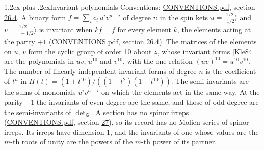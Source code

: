 \documentclass[10pt,a4paper]{article}
\makeatletter
\renewcommand\section{\@startsection{section}{1}{\z@}{-3ex plus -1ex minus -.2ex}%
  {1.2ex plus .2ex}{\normalfont\large\sffamily\bfseries\color{parttitle}}}
\numberwithin{equation}{section}
\newcommand{\grp}[1]{\mathsf{#1}}
\newcommand{\jm}[2]{\bigl\lvert{}^{#1}_{\,#2}\bigr\rangle}
\makeatother
\begin{document}
\section{Invariant polynomials}\label{s:invariants}
Conventions: \href{../../CONVENTIONS.pdf}{CONVENTIONS.pdf}, section \href{../../CONVENTIONS.pdf\#conv.26.4}{26.4}.
\leavevmode\label{n:local.spinor.uv}\label{n:local.binary.form}A binary form $f = \sum_i c_i\, u^i v^{n-i}$ of degree $n$ in the spin kets $u = \jm{1/2}{1/2}$ and $v = \jm{1/2}{-1/2}$ is invariant when $k f = f$ for every element $k$, the elements acting at the parity $+1$ (\href{../../CONVENTIONS.pdf}{CONVENTIONS.pdf}, section \href{../../CONVENTIONS.pdf\#conv.26.4}{26.4}).
The matrices of the elements on $u$, $v$ form the cyclic group of order 10 about $z$, whose invariant forms [\href{../../../REFERENCES.pdf\#ref.Kle84}{Kle84}] are the polynomials in $uv$, $u^{10}$ and $v^{10}$, with the one relation $(uv)^{10} = u^{10}v^{10}$. \label{n:function.hilbert}The number of linearly independent invariant forms of degree $n$ is the coefficient of $t^n$ in $H(t) = (1 + t^{10})/((1-t^{2})(1-t^{10}))$. The semi-invariants are the sums of monomials $u^i v^{n-i}$ on which the elements act in the same way. At the parity $-1$ the invariants of even degree are the same, and those of odd degree are the semi-invariants of $\det_{\grp{G}}$. A section has no spinor irreps (\href{../../CONVENTIONS.pdf}{CONVENTIONS.pdf}, section \href{../../CONVENTIONS.pdf\#conv.27}{27}), so its record has no Molien series of spinor irreps. Its irreps have dimension 1, and the invariants of one whose values are the $m$-th roots of unity are the powers of the $m$-th power of its partner.
\end{document}
